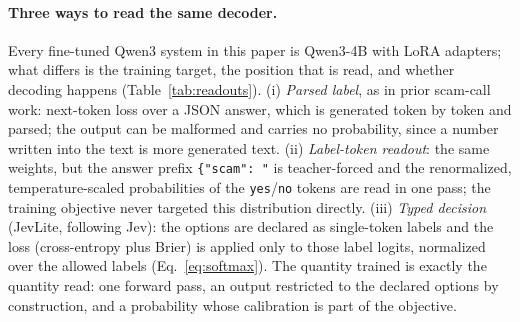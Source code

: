 \documentclass[11pt]{article}
\begin{document}
\paragraph{Three ways to read the same decoder.} Every fine-tuned Qwen3 system in this paper is Qwen3-4B with LoRA adapters; what differs is the training target, the position that is read, and whether decoding happens (Table~\ref{tab:readouts}). (i) \emph{Parsed label}, as in prior scam-call work: next-token loss over a JSON answer, which is generated token by token and parsed; the output can be malformed and carries no probability, since a number written into the text is more generated text. (ii) \emph{Label-token readout}: the same weights, but the answer prefix \texttt{\{"scam": "} is teacher-forced and the renormalized, temperature-scaled probabilities of the \texttt{yes}/\texttt{no} tokens are read in one pass; the training objective never targeted this distribution directly. (iii) \emph{Typed decision} (JevLite, following Jev): the options are declared as single-token labels and the loss (cross-entropy plus Brier) is applied only to those label logits, normalized over the allowed labels (Eq.~\ref{eq:softmax}). The quantity trained is exactly the quantity read: one forward pass, an output restricted to the declared options by construction, and a probability whose calibration is part of the objective.
\end{document}
